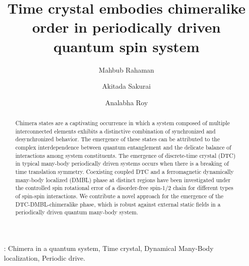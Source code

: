 \documentclass[12pt]{iopart}
\begin{document}
	
\title{Time crystal embodies chimeralike order in periodically driven quantum spin system}
\submitto{\NJP}
\author{Mahbub Rahaman}
\address{Department of Physics, The University of Burdwan, Burdwan 713104, India}	
\author{Akitada Sakurai}
\address{Quantum Information Science and Technology Unit, Okinawa Institute of Science and Technology Graduate University, Onna-son, Okinawa 904-0495, Japan}		
\author{Analabha Roy}
\address{Department of Physics, The University of Burdwan, Burdwan 713104, India}

\begin{abstract}
	Chimera states are a captivating occurrence in which a system composed of multiple interconnected elements exhibits a distinctive combination of synchronized and desynchronized behavior. The emergence of these states can be attributed to the complex interdependence between quantum entanglement and the delicate balance of interactions among system constituents. The emergence of discrete-time crystal (DTC) in typical many-body periodically driven systems occurs when there is a breaking of time translation symmetry. Coexisting coupled DTC and a ferromagnetic dynamically many-body localized (DMBL) phase at distinct regions have been investigated under the controlled spin rotational error of a disorder-free spin-1/2 chain for different types of spin-spin interactions. We contribute a novel approach for the emergence of the DTC-DMBL-chimeralike phase, which is robust against external static fields in a periodically driven quantum many-body system.
\end{abstract}
: Chimera in a quantum system, Time crystal, Dynamical Many-Body localization, Periodic drive. \\        
\maketitle
	
	
\end{document}
